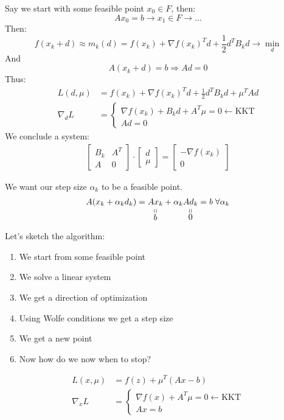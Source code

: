 Say we start with some feasible point $x_0 \in F$, then: 
\[ 
    A x_0 = b \longrightarrow x_1 \in F \longrightarrow \ldots
\]
Then: 
\[ 
    f(x_k + d) \approx m_k(d) = f(x_k) + \nabla f(x_k)^T d + \frac{1}{2} d^T B_k d \to \min_d
\] 
And 
\[ 
    A(x_k + d) = b \Longrightarrow A d = 0
\] 
Thus: 
\begin{align*}
    L(d, \mu) &= f(x_k) + \nabla f(x_k)^T d + \frac{1}{2} d^T B_k d + \mu^T A d \\ 
    \nabla_d L &= \begin{cases}
        \nabla f(x_k) + B_k d + A^T \mu = 0 \leftarrow \text{KKT} \\
        A d = 0
    \end{cases}
\end{align*}
We conclude a system: 
\begin{gather*}
    \begin{bmatrix}
        B_k & A^T \\ 
        A & 0
    \end{bmatrix} \cdot \begin{bmatrix}
        d \\ 
        \mu
    \end{bmatrix} = \begin{bmatrix}
        -\nabla f(x_k) \\ 
        0
    \end{bmatrix}
\end{gather*}

We want our step size $\alpha_k$ to be a feasible point.
\[ 
    A(x_k + \alpha_k d_k) = \stackbelow{A x_k}{b} + \alpha_k \stackbelow{A d_k}{0} = b \; \forall \alpha_k
\] 

Let's sketch the algorithm:
\begin{enumerate}
    \item We start from some feasible point 
    \item We solve a linear system 
    \item We get a direction of optimization
    \item Using Wolfe conditions we get a step size
    \item We get a new point
    \item Now how do we now when to stop? 
\end{enumerate}

\begin{align*}
    L(x, \mu) &= f(z) + \mu^T (A x - b) \\ 
    \nabla_x L &= \begin{cases}
        \nabla f(x) + A^T \mu = 0 \leftarrow \text{KKT} \\ 
        A x = b
    \end{cases}
\end{align*}

